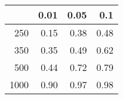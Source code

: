 % 
\begin{tabular}{rrrr}
  \hline
 & 0.01 & 0.05 & 0.1 \\ 
  \hline
250 & 0.15 & 0.38 & 0.48 \\ 
  350 & 0.35 & 0.49 & 0.62 \\ 
  500 & 0.44 & 0.72 & 0.79 \\ 
  1000 & 0.90 & 0.97 & 0.98 \\ 
   \hline
\end{tabular}

